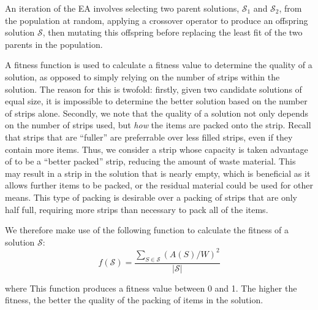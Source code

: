 \documentclass{elsarticle}
\begin{document}
An iteration of the EA involves selecting two parent solutions, $\mathcal{S}_1$ and $\mathcal{S}_2$, from the population at random, applying a crossover operator to produce an offspring solution $\mathcal{S}$, then mutating this offspring before replacing the least fit of the two parents in the population.

A fitness function is used to calculate a fitness value to determine the quality of a solution, as opposed to simply relying on the number of strips within the solution. The reason for this is twofold: firstly, given two candidate solutions of equal size, it is impossible to determine the better solution based on the number of strips alone. Secondly, we note that the quality of a solution not only depends on the number of strips used, but \emph{how} the items are packed onto the strip. Recall that strips that are ``fuller'' are preferrable over less filled strips, even if they contain more items. Thus, we consider a strip whose capacity is taken advantage of to be a ``better packed'' strip, reducing the amount of waste material. This may result in a strip in the solution that is nearly empty, which is beneficial as it allows further items to be packed, or the residual material could be used for other means. This type of packing is desirable over a packing of strips that are only half full, requiring more strips than necessary to pack all of the items. 

We therefore make use of the following function to calculate the fitness of a solution $\mathcal{S}$: 
\begin{equation}
	f(\mathcal{S}) = \frac{\sum_{S \in \mathcal{S}} (A(S)/W)^2}{|\mathcal{S}|}
\end{equation}

\noindent where  This function produces a fitness value between 0 and 1. The higher the fitness, the better the quality of the packing of items in the solution.
\end{document}
